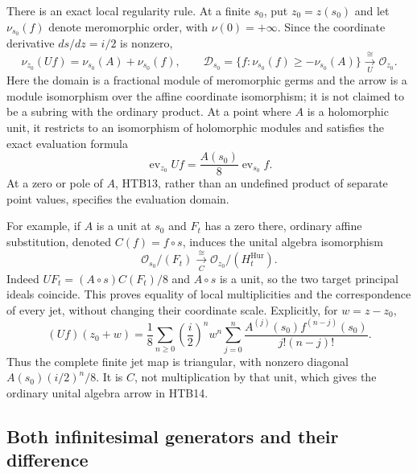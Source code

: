\documentclass[11pt]{article}
\theoremstyle{definition}
\begin{document}
There is an exact local regularity rule. At a finite $s_0$, put
$z_0=z(s_0)$ and let $\nu_{s_0}(f)$ denote meromorphic order, with
$\nu(0)=+\infty$. Since the coordinate derivative $ds/dz=i/2$ is
nonzero,
\begin{equation}\tag{HTB13}
 \nu_{z_0}(Uf)=\nu_{s_0}(A)+\nu_{s_0}(f),\qquad
 \mathcal D_{s_0}
 =\{f:\nu_{s_0}(f)\ge-\nu_{s_0}(A)\}
 \xrightarrow[\;U\;]{\ \cong\ }\mathcal O_{z_0}.
\end{equation}
Here the domain is a fractional module of meromorphic germs and the
arrow is a module isomorphism over the affine coordinate isomorphism;
it is not claimed to be a subring with the ordinary product. At a point
where $A$ is a holomorphic unit, it restricts to an isomorphism of
holomorphic modules and satisfies the exact evaluation formula
\[
 \operatorname{ev}_{z_0}Uf
   =\frac{A(s_0)}8\operatorname{ev}_{s_0}f.
\]
At a zero or pole of $A$, HTB13, rather than an undefined product of
separate point values, specifies the evaluation domain.

For example, if $A$ is a unit at $s_0$ and $F_t$ has a zero there,
ordinary affine substitution, denoted $C(f)=f\circ s$, induces the
unital algebra isomorphism
\begin{equation}\tag{HTB14}
 \mathcal O_{s_0}/(F_t)
 \xrightarrow[\;C\;]{\ \cong\ }
 \mathcal O_{z_0}/(H_t^{\mathrm{Hur}}).
\end{equation}
Indeed $U F_t=(A\circ s)C(F_t)/8$ and $A\circ s$ is a unit, so the
two target principal ideals coincide. This proves equality of local
multiplicities and the correspondence of every jet, without changing
their coordinate scale. Explicitly, for $w=z-z_0$,
\[
 (Uf)(z_0+w)=\frac18\sum_{n\ge0}
       \left(\frac{i}{2}\right)^n w^n
       \sum_{j=0}^n\frac{A^{(j)}(s_0)f^{(n-j)}(s_0)}{j!(n-j)!}.
\]
Thus the complete finite jet map is triangular, with nonzero diagonal
$A(s_0)(i/2)^n/8$. It is $C$, not multiplication by that unit, which
gives the ordinary unital algebra arrow in HTB14.

\subsection{Both infinitesimal generators and their difference}
\end{document}
